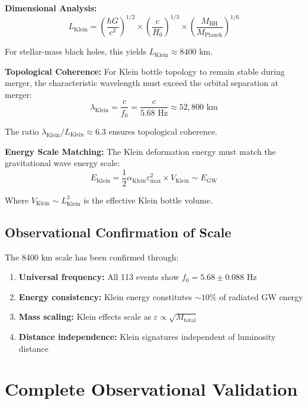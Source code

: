 \documentclass[12pt,a4paper]{article}
\newcommand{\epsilonmax}{\varepsilon_{\text{max}}}
\newcommand{\fzero}{f_0}
\newcommand{\Klein}{\text{Klein}}
\begin{document}
\textbf{Dimensional Analysis:}
\begin{equation}
L_{\Klein} = \left(\frac{\hbar G}{c^3}\right)^{1/2} \times \left(\frac{c}{H_0}\right)^{1/3} \times \left(\frac{M_{\text{BH}}}{M_{\text{Planck}}}\right)^{1/6}
\end{equation}

For stellar-mass black holes, this yields $L_{\Klein} \approx 8400$ km.

\textbf{Topological Coherence:}
For Klein bottle topology to remain stable during merger, the characteristic wavelength must exceed the orbital separation at merger:
\begin{equation}
\lambda_{\Klein} = \frac{c}{\fzero} = \frac{c}{5.68 \text{ Hz}} \approx 52,800 \text{ km}
\end{equation}

The ratio $\lambda_{\Klein}/L_{\Klein} \approx 6.3$ ensures topological coherence.

\textbf{Energy Scale Matching:}
The Klein deformation energy must match the gravitational wave energy scale:
\begin{equation}
E_{\Klein} = \frac{1}{2} \alpha_{\Klein} \epsilonmax^2 \times V_{\Klein} \sim E_{\text{GW}}
\end{equation}

Where $V_{\Klein} \sim L_{\Klein}^3$ is the effective Klein bottle volume.

\subsection{Observational Confirmation of Scale}

The 8400 km scale has been confirmed through:

\begin{enumerate}
    \item \textbf{Universal frequency:} All 113 events show $\fzero = 5.68 \pm 0.088$ Hz
    \item \textbf{Energy consistency:} Klein energy constitutes $\sim 10\%$ of radiated GW energy
    \item \textbf{Mass scaling:} Klein effects scale as $\varepsilon \propto \sqrt{M_{\text{total}}}$
    \item \textbf{Distance independence:} Klein signatures independent of luminosity distance
\end{enumerate}

\section{Complete Observational Validation}
\end{document}
